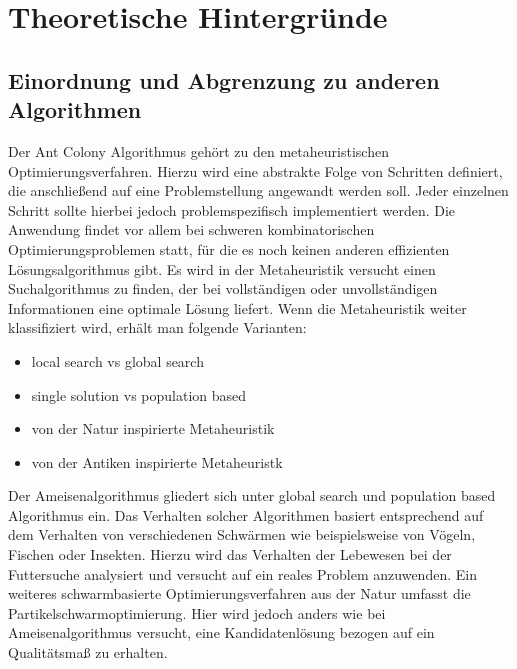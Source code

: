 \section{Theoretische Hintergründe}

\subsection{Einordnung und Abgrenzung zu anderen Algorithmen} \label{chap:Einordnung}

Der Ant Colony Algorithmus gehört zu den metaheuristischen Optimierungsverfahren. Hierzu wird eine abstrakte Folge von Schritten  definiert, die anschließend auf eine Problemstellung angewandt werden soll. Jeder einzelnen Schritt sollte hierbei jedoch problemspezifisch implementiert werden. Die Anwendung findet vor allem bei schweren kombinatorischen Optimierungsproblemen statt, für die es noch keinen anderen effizienten Lösungsalgorithmus gibt. Es wird in der Metaheuristik versucht einen Suchalgorithmus zu finden, der bei vollständigen oder unvollständigen Informationen eine optimale Lösung liefert. \newline
Wenn die Metaheuristik weiter klassifiziert wird, erhält man folgende Varianten:

\begin{itemize}
  \item local search vs global search
  \item single solution vs population based
  \item von der Natur inspirierte Metaheuristik
  \item von der Antiken inspirierte Metaheuristk
\end{itemize}

Der Ameisenalgorithmus gliedert sich unter global search und population based Algorithmus ein. 
Das Verhalten solcher Algorithmen basiert entsprechend auf dem Verhalten von verschiedenen Schwärmen wie beispielsweise von Vögeln, Fischen oder Insekten. Hierzu wird das Verhalten der Lebewesen bei der Futtersuche analysiert und versucht auf ein reales Problem anzuwenden. Ein weiteres schwarmbasierte Optimierungsverfahren aus der Natur umfasst die Partikelschwarmoptimierung. Hier wird jedoch anders wie bei Ameisenalgorithmus versucht, eine Kandidatenlösung bezogen auf ein Qualitätsmaß zu erhalten. 

